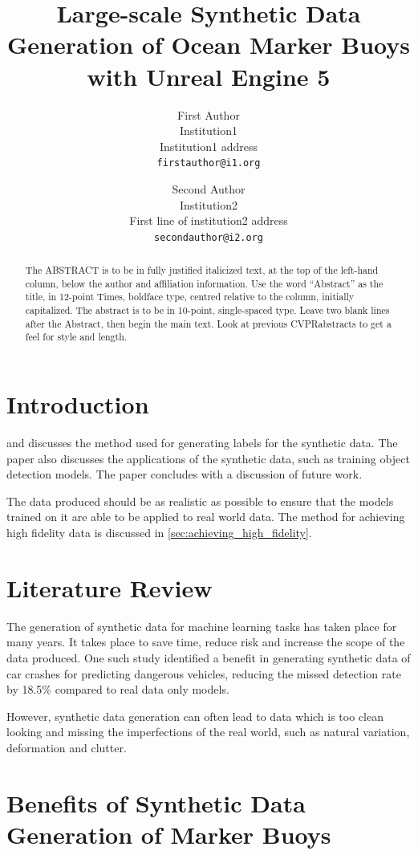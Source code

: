 \documentclass[10pt,twocolumn,letterpaper]{article}
\title{Large-scale Synthetic Data Generation of Ocean Marker Buoys with Unreal Engine 5}
\author{First Author\\
Institution1\\
Institution1 address\\
{\tt\small firstauthor@i1.org}
\and
Second Author\\
Institution2\\
First line of institution2 address\\
{\tt\small secondauthor@i2.org}
}
\def\confName{CVPR}
\begin{document}
\maketitle

\begin{abstract}
    The ABSTRACT is to be in fully justified italicized text, at the top of the left-hand column, below the author and affiliation information.
    Use the word ``Abstract'' as the title, in 12-point Times, boldface type, centred relative to the column, initially capitalized.
    The abstract is to be in 10-point, single-spaced type.
    Leave two blank lines after the Abstract, then begin the main text.
    Look at previous \confName abstracts to get a feel for style and length.
    \end{abstract}

\section{Introduction}

and discusses the method used for generating labels for the synthetic data. The paper also discusses the applications of the synthetic data, such as training object detection models. The paper concludes with a discussion of future work. 

The data produced should be as realistic as possible to ensure that the models trained on it are able to be applied to real world data. The method for achieving high fidelity data is discussed in \ref{sec:achieving_high_fidelity}.

\section{Literature Review}

The generation of synthetic data for machine learning tasks has taken place for many years. It takes place to save time, reduce risk and increase the scope of the data produced. One such study identified a benefit in generating synthetic data of car crashes for predicting dangerous vehicles, reducing the missed detection rate by 18.5\% compared to real data only models. \cite{Kim_Lee_Hwang_Suh_2019} 

However, synthetic data generation can often lead to data which is too clean looking and missing the imperfections of the real world, such as natural variation, deformation and clutter. \cite{Feng_2024_CVPR}

\section{Benefits of Synthetic Data Generation of Marker Buoys}
\end{document}
